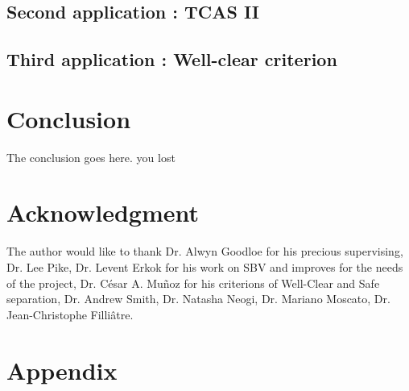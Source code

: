 \documentclass[a4paper,11pt,final]{article}
\begin{document}
	\subsection{Second application : TCAS II}
	\subsection{Third application : Well-clear criterion}
	
	\section*{Conclusion}
	The conclusion goes here.
	you lost 
	
	
	\cleardoublepage{}
	
	
	
	
	\section*{Acknowledgment}
	
	The author would like to thank Dr. Alwyn Goodloe for his precious supervising, Dr. Lee Pike, Dr. Levent Erkok for his work on SBV and improves for the needs of the project, Dr. César A. Muñoz for his criterions of Well-Clear and Safe separation, Dr. Andrew Smith, Dr. Natasha Neogi, Dr. Mariano Moscato, Dr. Jean-Christophe Filliâtre.
	
	
	\section*{Appendix}
	
\end{document}
